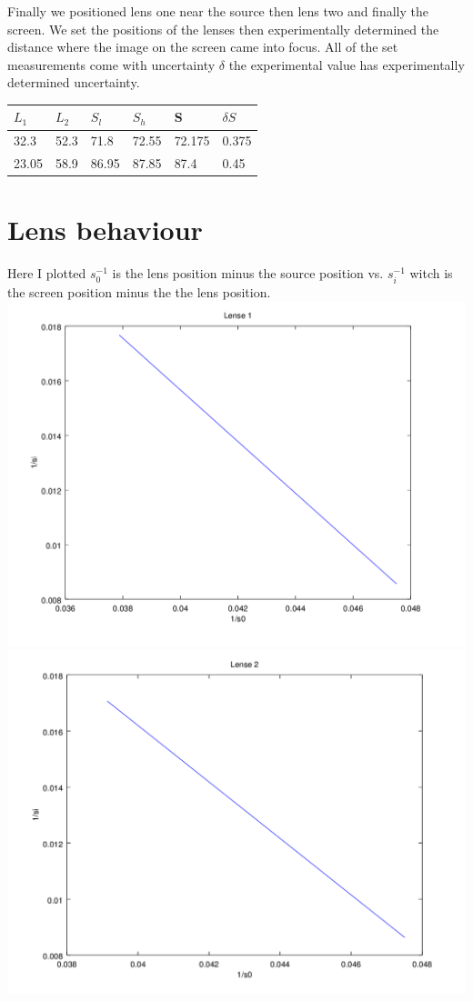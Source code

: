 \documentclass[12pt,a4paper]{article}
\begin{document}
Finally we positioned lens one near the source then lens two and finally the screen.  We set the positions of the lenses then experimentally determined the distance where the image on the screen came into focus.  All of the set measurements come with uncertainty $\delta$ the experimental value has experimentally determined uncertainty.\\

\begin{tabular}{| l | l | l | l | l | l |}
\hline
$L_1$ & $L_2$ & $S_l$ & $S_h$ & S & $\delta S$\\
\hline
32.3 & 52.3 & 71.8 & 72.55 & 72.175 & 0.375\\
\hline
23.05 & 58.9 & 86.95 & 87.85 & 87.4 & 0.45\\
\hline

\end{tabular}

\section{Lens behaviour}
Here I plotted $s_0^{-1}$ is the lens position minus the source position vs. $s_i^{-1}$ witch is the screen position minus the the lens position.\\
\includegraphics[scale=.7]{l1.png}\\
\includegraphics[scale=.7]{l2.png}\\
\end{document}
